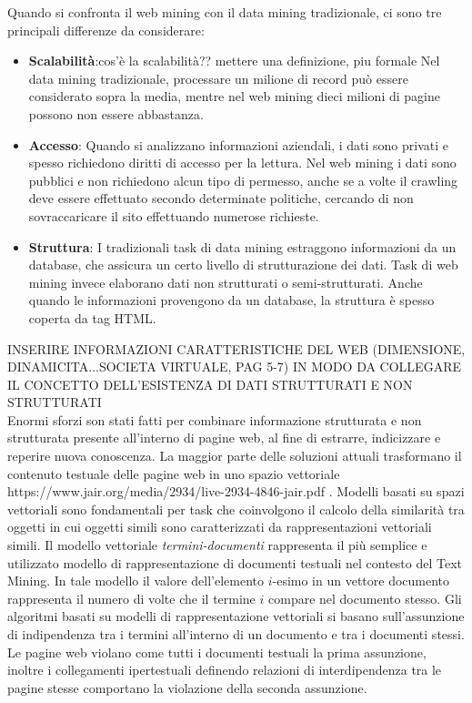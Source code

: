 Quando si confronta il web mining con il data mining tradizionale, ci sono tre principali differenze da considerare:
\begin{itemize}
\item \textbf{Scalabilità}:\color{red}cos'è la scalabilità?? mettere una definizione, piu formale
\color{black}
 Nel data mining tradizionale, processare un milione di record può essere considerato sopra la media, mentre nel web mining dieci milioni di pagine possono non essere abbastanza.
\item \textbf{Accesso}: Quando si analizzano informazioni aziendali, i dati sono privati e spesso richiedono diritti di accesso per la lettura. Nel web mining i dati sono pubblici e non richiedono alcun tipo di permesso, anche se a volte il crawling deve essere effettuato secondo determinate politiche, cercando di non sovraccaricare il sito effettuando numerose richieste.
\item \textbf{Struttura}: I tradizionali task di data mining estraggono informazioni da un database, che assicura un certo livello di strutturazione dei dati. Task di web mining invece elaborano dati non strutturati o semi-strutturati. Anche quando le informazioni provengono da un database, la struttura è spesso coperta da tag HTML.
\end{itemize}
\color{red}
INSERIRE INFORMAZIONI CARATTERISTICHE DEL WEB (DIMENSIONE, DINAMICITA...SOCIETA VIRTUALE, PAG 5-7) IN MODO DA COLLEGARE IL CONCETTO DELL'ESISTENZA DI DATI STRUTTURATI E NON STRUTTURATI
\color{black}
\\
Enormi sforzi son stati fatti per combinare informazione strutturata e non strutturata presente all'interno di pagine web, al fine di estrarre, indicizzare e reperire nuova conoscenza. 
La maggior parte delle soluzioni attuali trasformano il contenuto testuale delle pagine web in uno spazio vettoriale \cite{}\color{red}https://www.jair.org/media/2934/live-2934-4846-jair.pdf \color{black}. Modelli basati su spazi vettoriali sono fondamentali per task che coinvolgono il calcolo della similarità tra oggetti in cui oggetti simili sono caratterizzati da rappresentazioni vettoriali simili. Il modello vettoriale \textit{termini-documenti} rappresenta il più semplice e utilizzato modello di rappresentazione di documenti testuali nel contesto del Text Mining. In tale modello il valore dell'elemento $i$-esimo in un vettore documento rappresenta il numero di volte che il termine $i$ compare nel documento stesso.    
Gli algoritmi basati su modelli di rappresentazione vettoriali si basano sull'assunzione di indipendenza tra i termini all'interno di un documento e tra i documenti stessi. Le pagine web violano come tutti i documenti testuali la prima assunzione, inoltre i collegamenti ipertestuali definendo relazioni di interdipendenza tra le pagine stesse comportano la violazione della seconda assunzione.

